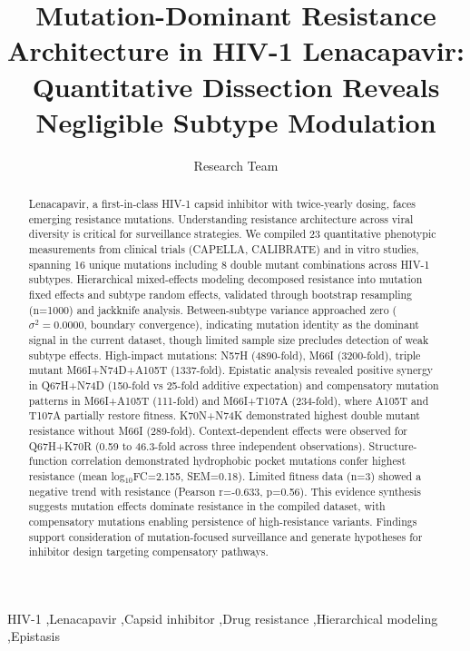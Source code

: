 \documentclass[preprint]{elsarticle}
\begin{document}
\begin{frontmatter}

\title{Mutation-Dominant Resistance Architecture in HIV-1 Lenacapavir: Quantitative Dissection Reveals Negligible Subtype Modulation}

\author[inst1]{Research Team}

\address[inst1]{Institution Address}

\begin{abstract}
Lenacapavir, a first-in-class HIV-1 capsid inhibitor with twice-yearly dosing, faces emerging resistance mutations. Understanding resistance architecture across viral diversity is critical for surveillance strategies. We compiled 23 quantitative phenotypic measurements from clinical trials (CAPELLA, CALIBRATE) and in vitro studies, spanning 16 unique mutations including 8 double mutant combinations across HIV-1 subtypes. Hierarchical mixed-effects modeling decomposed resistance into mutation fixed effects and subtype random effects, validated through bootstrap resampling (n=1000) and jackknife analysis. Between-subtype variance approached zero ($\sigma^2=0.0000$, boundary convergence), indicating mutation identity as the dominant signal in the current dataset, though limited sample size precludes detection of weak subtype effects. High-impact mutations: N57H (4890-fold), M66I (3200-fold), triple mutant M66I+N74D+A105T (1337-fold). Epistatic analysis revealed positive synergy in Q67H+N74D (150-fold vs 25-fold additive expectation) and compensatory mutation patterns in M66I+A105T (111-fold) and M66I+T107A (234-fold), where A105T and T107A partially restore fitness. K70N+N74K demonstrated highest double mutant resistance without M66I (289-fold). Context-dependent effects were observed for Q67H+K70R (0.59 to 46.3-fold across three independent observations). Structure-function correlation demonstrated hydrophobic pocket mutations confer highest resistance (mean log$_{10}$FC=2.155, SEM=0.18). Limited fitness data (n=3) showed a negative trend with resistance (Pearson r=-0.633, p=0.56). This evidence synthesis suggests mutation effects dominate resistance in the compiled dataset, with compensatory mutations enabling persistence of high-resistance variants. Findings support consideration of mutation-focused surveillance and generate hypotheses for inhibitor design targeting compensatory pathways.
\end{abstract}

\begin{keyword}
HIV-1 \sep Lenacapavir \sep Capsid inhibitor \sep Drug resistance \sep Hierarchical modeling \sep Epistasis
\end{keyword}

\end{frontmatter}
\end{document}
